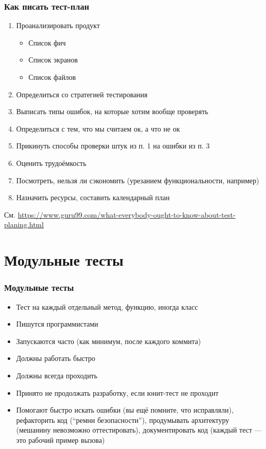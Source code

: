 \documentclass[xetex,mathserif,serif]{beamer}
\begin{document}
	\begin{frame}
		\frametitle{Как писать тест-план}
		\begin{enumerate}
			\item Проанализировать продукт
			\begin{itemize}
				\item Список фич
				\item Список экранов
				\item Список файлов
			\end{itemize}
			\item Определиться со стратегией тестирования
			\item Выписать типы ошибок, на которые хотим вообще проверять
			\item Определиться с тем, что мы считаем ок, а что не ок
			\item Прикинуть способы проверки штук из п. 1 на ошибки из п. 3
			\item Оценить трудоёмкость
			\item Посмотреть, нельзя ли сэкономить (урезанием функциональности, например)
			\item Назначить ресурсы, составить календарный план
		\end{enumerate}
		\begin{footnotesize}См. \url{https://www.guru99.com/what-everybody-ought-to-know-about-test-planing.html}\end{footnotesize}
	\end{frame}

	\section{Модульные тесты}

	\begin{frame}
		\frametitle{Модульные тесты}
		\begin{itemize}
			\item Тест на каждый отдельный метод, функцию, иногда класс
			\item Пишутся программистами
			\item Запускаются часто (как минимум, после каждого коммита)
			\item Должны работать быстро
			\item Должны всегда проходить 
			\item Принято не продолжать разработку, если юнит-тест не проходит
			\item Помогают быстро искать ошибки (вы ещё помните, что исправляли), рефакторить код (``ремни безопасности''), продумывать архитектуру (мешанину невозможно оттестировать), документировать код (каждый тест --- это рабочий пример вызова)
		\end{itemize}
	\end{frame}
\end{document}
